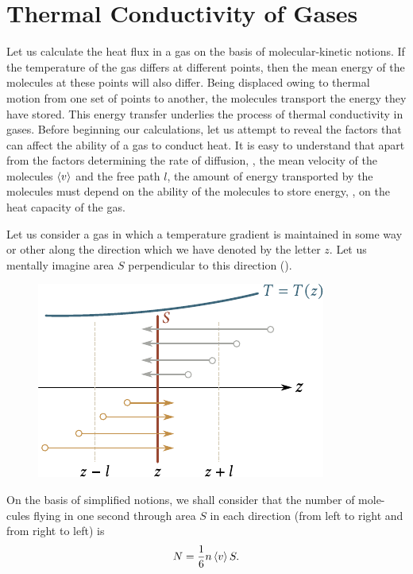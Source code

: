 \section{Thermal Conductivity of Gases}\label{sec:16_4}

Let us calculate the heat flux in a gas on the basis of molecular-kinetic notions. If the temperature of the gas differs at different points, then the mean energy of the molecules at these points will also differ. Being displaced owing to thermal motion from one set of points to another, the molecules transport the energy they have stored. This energy transfer underlies the process of thermal conductivity in gases. Before beginning our calculations, let us attempt to reveal the factors that can affect the ability of a gas to conduct heat. It is easy to understand that apart from the factors determining the rate of diffusion, \ie, the mean velocity of the molecules $\left\langle v \right\rangle$ and
the free path $l$, the amount of energy transported by the molecules must depend on the ability of the molecules to store energy, \ie, on the heat capacity of the gas.

Let us consider a gas in which a temperature gradient is maintained in some way or other along the direction which we have denoted by the letter $z$. Let us mentally imagine area $S$ perpendicular to this direction ().

\begin{figure}[t]
	\begin{center}
		\includegraphics[scale=1]{figures/ch_16/fig_16_7.pdf}
		\caption[]{}
		\label{fig:16_7}
	\end{center}
	\vspace{-0.8cm}
\end{figure}

On the basis of simplified notions, we shall consider that the number of mole-cules flying in one second through area $S$ in each direction (from left to right and from right to left) is
\begin{equation}\label{eq:16_20}
    N = \frac{1}{6} n \left\langle v \right\rangle S.
\end{equation}

